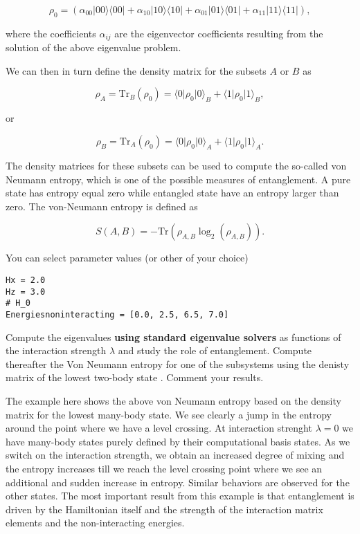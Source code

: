 \documentclass[%
oneside,                 %
final,                   %
10pt]{article}
\begin{document}
\[
\rho_0=\left(\alpha_{00}\vert 00 \rangle\langle 00\vert+\alpha_{10}\vert 10 \rangle\langle 10\vert+\alpha_{01}\vert 01 \rangle\langle 01\vert+\alpha_{11}\vert 11 \rangle\langle 11\vert\right),
\]

where the coefficients $\alpha_{ij}$ are the eigenvector coefficients
resulting from the solution of the above eigenvalue problem.

We can
then in turn define the density matrix for the subsets $A$ or $B$ as

\[
\rho_A=\mathrm{Tr}_B(\rho_{0})=\langle 0 \vert \rho_{0} \vert 0\rangle_{B}+\langle 1 \vert \rho_{0} \vert 1\rangle_{B},
\]

or

\[
\rho_B=\mathrm{Tr}_A(\rho_0)=\langle 0 \vert \rho_{0} \vert 0\rangle_{A}+\langle 1 \vert \rho_{0} \vert 1\rangle_{A}.
\]

The density matrices for these subsets can be used to compute the
so-called von Neumann entropy, which is one of the possible measures
of entanglement. A pure state has entropy equal zero while entangled
state have an entropy larger than zero. The von-Neumann entropy is
defined as

\[
S(A,B)=-\mathrm{Tr}\left(\rho_{A,B}\log_2 (\rho_{A,B})\right).
\]

You can select parameter values (or other of your choice)





\begin{verbatim}
Hx = 2.0
Hz = 3.0
# H_0
Energiesnoninteracting = [0.0, 2.5, 6.5, 7.0]

\end{verbatim}


Compute the eigenvalues \textbf{using standard eigenvalue solvers} as functions of
the interaction strength $\lambda$ and study the role of entanglement.
Compute thereafter the Von Neumann entropy for one of the subsystems using the denisty matrix  of the lowest
two-body state . Comment your results.

The example here shows the above von Neumann entropy based on the
density matrix for the lowest many-body state. We see clearly a jump
in the entropy around the point where we have a level crossing. At
interaction strenght $\lambda=0$ we have many-body states purely
defined by their computational basis states. As we switch on the
interaction strength, we obtain an increased degree of mixing and the
entropy increases till we reach the level crossing point where we see
an additional and sudden increase in entropy. Similar behaviors are
observed for the other states. The most important result from this
example is that entanglement is driven by the Hamiltonian itself and
the strength of the interaction matrix elements and the
non-interacting energies.
\end{document}
